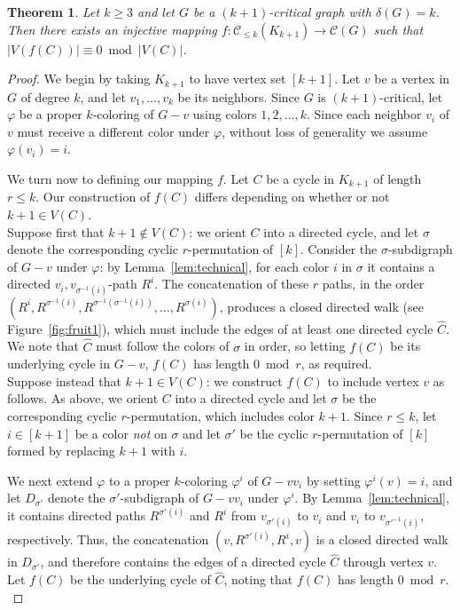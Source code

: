 \documentclass[12pt]{article}
\newtheorem{theorem}{Theorem}
\numberwithin{theorem}{section}
\begin{document}
\begin{theorem}
    \label{thm:injectivity}
    Let $k \ge 3$ and let $G$ be a $(k+1)$-critical graph with $\delta(G)=k$.  Then there exists an injective mapping $f:\mathcal{C}_{\le k}(K_{k+1}) \to \mathcal{C}(G)$ such that $\vert V(f(C)) \vert \equiv 0 \bmod \vert V(C) \vert$.
\end{theorem}

\begin{proof}
    We begin by taking $K_{k+1}$ to have vertex set $[k+1]$.  Let $v$ be a vertex in $G$ of degree $k$, and let $v_1,\ldots,v_k$ be its neighbors. Since $G$ is $(k+1)$-critical, let $\varphi$ be a proper $k$-coloring of $G-v$ using colors $1,2,\ldots,k$. Since each neighbor $v_i$ of $v$ must receive a different color under $\varphi$, without loss of generality we assume $\varphi(v_i)=i$.

    We turn now to defining our mapping $f$. Let $C$ be a cycle in $K_{k+1}$ of length $r  \le k$.  Our construction of $f(C)$ differs depending on whether or not $k+1 \in V(C)$.  \\

    Suppose first that $k+1 \notin V(C)$: we orient $C$ into a directed cycle, and let $\sigma$ denote the corresponding cyclic $r$-permutation of $[k]$.  Consider  the $\sigma$-subdigraph of $G-v$ under $\varphi$: by Lemma~\ref{lem:technical}, for each color $i$ in $\sigma$ it contains a directed $v_i,v_{\sigma^{-1}(i)}$-path $R^i$.  The concatenation of these $r$ paths, in the order $(R^i, R^{\sigma^{-1}(i)}, R^{\sigma^{-1}(\sigma^{-1}(i))}, \ldots, R^{\sigma(i)})$, produces a closed directed walk (see Figure~\ref{fig:fruit1}), which must include the edges of at least one directed cycle $\widehat{C}$.  We note that $\widehat{C}$ must follow the colors of $\sigma$ in order, so letting $f(C)$ be its underlying cycle in $G-v$, $f(C)$ has length $0\bmod r$, as required.\\

    Suppose instead that $k+1 \in V(C)$: we construct $f(C)$ to include vertex $v$ as follows.  As above, we orient $C$ into a directed cycle and let $\sigma$ be the corresponding cyclic $r$-permutation, which includes color $k+1$.  Since $r \le k$, let $i \in [k+1]$ be a color {\em not} on $\sigma$ and let $\sigma'$ be the cyclic $r$-permutation of $[k]$ formed by replacing $k+1$ with $i$.

    We next extend $\varphi$ to a proper $k$-coloring $\varphi^i$ of $G-vv_i$ by setting $\varphi^i(v)=i$, and let $D_{\sigma'}$ denote the $\sigma'$-subdigraph of $G-vv_i$ under $\varphi^i$.  By Lemma~\ref{lem:technical}, it contains directed paths $R^{\sigma'(i)}$ and $R^i$ from $v_{\sigma'(i)}$ to $v_i$ and $v_i$ to $v_{\sigma'^{-1}(i)}$, respectively. Thus, the concatenation $(v, R^{\sigma'(i)}, R^i, v)$ is a closed directed walk in $D_{\sigma'}$, and therefore contains the edges of a directed cycle $\widehat{C}$ through vertex $v$. Let $f(C)$ be the underlying cycle of $\widehat{C}$, noting that $f(C)$ has length $0 \bmod r$.\\


\end{proof}
\end{document}
